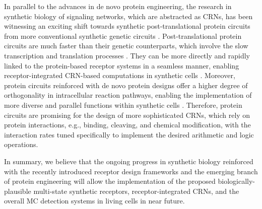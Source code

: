 \documentclass[twocolumn]{IEEEtran}
\begin{document}
In parallel to the advances in de novo protein engineering, the research in synthetic biology of signaling networks, which are abstracted as CRNs, has been witnessing an exciting shift towards synthetic post-translational protein circuits from more conventional synthetic genetic circuits \cite{chen2021programmable}. Post-translational protein circuits are much faster than their genetic counterparts, which involve the slow transcription and translation processes \cite{chen2021programmable}. They can be more directly and rapidly linked to the protein-based receptor systems in a seamless manner, enabling receptor-integrated CRN-based computations in synthetic cells \cite{gao2018programmable}. Moreover, protein circuits reinforced with de novo protein designs offer a higher degree of orthogonality in intracellular reaction pathways, enabling the implementation of more diverse and parallel functions within synthetic cells \cite{chen2021programmable, chen2019programmable, lim2010designing}. Therefore, protein circuits are promising for the design of more sophisticated CRNs, which rely on protein interactions, e.g., binding, cleaving, and chemical modification, with the interaction rates tuned specifically to implement the desired arithmetic and logic operations. 

In summary, we believe that the ongoing progress in synthetic biology reinforced with the recently introduced receptor design frameworks and the emerging branch of protein engineering will allow the implementation of the proposed biologically-plausible multi-state synthetic receptors, receptor-integrated CRNs, and the overall MC detection systems in living cells in near future.


%




\end{document}

